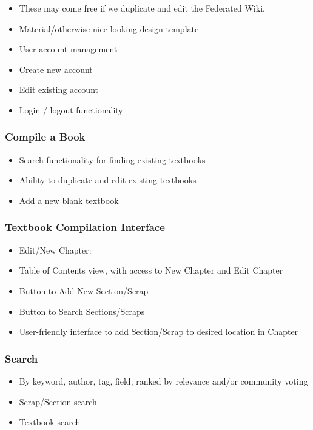 \documentclass[onecolumn, draftclsnofoot,10pt, compsoc]{IEEEtran}
\begin{document}
{\begin{itemize}
\item These may come free if we duplicate and edit the Federated Wiki.
\item Material/otherwise nice looking design template
\item User account management
\item Create new account
\item Edit existing account
\item Login / logout functionality
\end{itemize}

\subsubsection[System feature 2: Compile a book]{Compile a Book}
\begin{itemize}
\item Search functionality for finding existing textbooks
\item Ability to duplicate and edit existing textbooks
\item Add a new blank textbook
\end{itemize}

\subsubsection[System feature 3: Textbook Compilation Interface]{Textbook Compilation Interface}
\begin{itemize}
\item Edit/New Chapter:
\item Table of Contents view, with access to New Chapter and Edit Chapter
\item Button to Add New Section/Scrap
\item Button to Search Sections/Scraps
\item User-friendly interface to add Section/Scrap to desired location in Chapter
\end{itemize}

\subsubsection[System feature 4: Search Feature]{Search}
\begin{itemize}
\item By keyword, author, tag, field; ranked by relevance and/or community voting
\item Scrap/Section search
\item Textbook search
\end{itemize}

}
\end{document}
